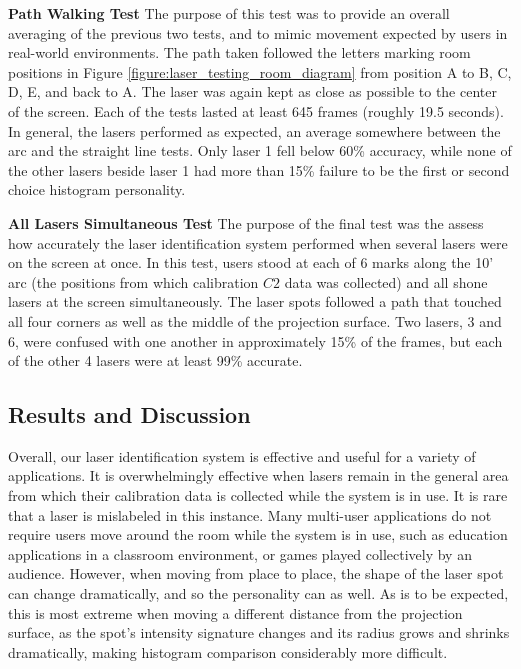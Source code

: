 \documentclass[review]{vgtc}                 %
\begin{document}
\textbf{Path Walking Test} The purpose of this test was to provide an
overall averaging of the previous two tests, and to mimic movement
expected by users in real-world environments. The path taken followed
the letters marking room positions in Figure
\ref{figure:laser_testing_room_diagram} from position A to B, C, D, E,
and back to A. The laser was again kept as close as possible to the
center of the screen. Each of the tests lasted at least 645 frames
(roughly 19.5 seconds). In general, the lasers performed as expected,
an average somewhere between the arc and the straight line tests. Only
laser 1 fell below 60\% accuracy, while none of the other lasers beside laser 1 had more
than 15\% failure to be the first or second choice histogram
personality.

\textbf{All Lasers Simultaneous Test} The purpose of the final test
was the assess how accurately the laser identification system
performed when several lasers were on the screen at once. In this
test, users stood at each of 6 marks along the 10' arc (the positions
from which calibration $C2$ data was collected) and all shone lasers
at the screen simultaneously. The laser spots followed a path that
touched all four corners as well as the middle of the projection
surface.  Two lasers, 3 and 6, were confused with one another in
approximately 15\% of the frames, but each of the other 4 lasers were
at least 99\% accurate.

\subsection{Results and Discussion}

Overall, our laser identification system is effective and useful for a
variety of applications. It is overwhelmingly effective when lasers
remain in the general area from which their calibration data is
collected while the system is in use. It is rare that a laser is
mislabeled in this instance. Many multi-user applications do not
require users move around the room while the system is in use, such as
education applications in a classroom environment, or games played
collectively by an audience. However, when moving from place to place,
the shape of the laser spot can change dramatically, and so the
personality can as well. As is to be expected, this is most extreme
when moving a different distance from the projection surface, as the
spot's intensity signature changes and its radius grows and shrinks
dramatically, making histogram comparison considerably more difficult.
\end{document}
